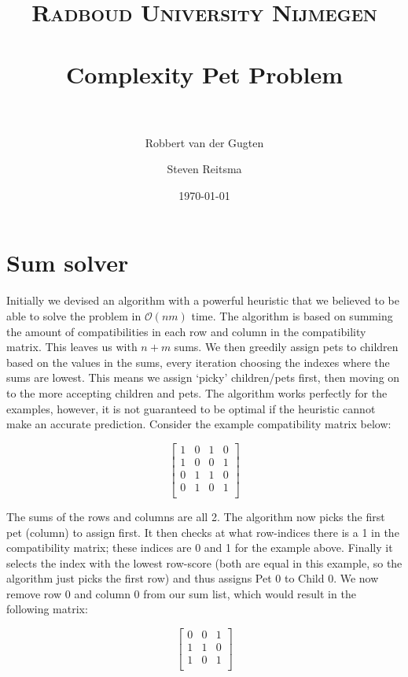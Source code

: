 \documentclass[paper=a4, fontsize=11pt]{scrartcl} %
\title{	
\normalfont \normalsize 
\textsc{Radboud University Nijmegen} \\ [25pt] %
\horrule{0.5pt} \\[0.4cm] %
\huge Complexity Pet Problem \\ %
\horrule{2pt} \\[0.5cm] %
}
\author{Robbert van der Gugten \and Steven Reitsma} %
\date{\normalsize\today} %
\numberwithin{equation}{section} %
\numberwithin{figure}{section} %
\numberwithin{table}{section} %
\begin{document}
\maketitle %


\section{Sum solver}

Initially we devised an algorithm with a powerful heuristic that we believed to be able to solve the problem in $\mathcal{O}(nm)$ time.
The algorithm is based on summing the amount of compatibilities in each row and column in the compatibility matrix.
This leaves us with $n+m$ sums.
We then greedily assign pets to children based on the values in the sums, every iteration choosing the indexes where the sums are lowest.
This means we assign `picky' children/pets first, then moving on to the more accepting children and pets.
The algorithm works perfectly for the examples, however, it is not guaranteed to be optimal if the heuristic cannot make an accurate prediction.
Consider the example compatibility matrix below:

\begin{equation}
	\begin{bmatrix}
	1 & 0 & 1 & 0\\
	1 & 0 & 0 & 1\\
	0 & 1 & 1 & 0\\
	0 & 1 & 0 & 1\\
	\end{bmatrix}
\end{equation}

The sums of the rows and columns are all 2.
The algorithm now picks the first pet (column) to assign first.
It then checks at what row-indices there is a 1 in the compatibility matrix; these indices are 0 and 1 for the example above.
Finally it selects the index with the lowest row-score (both are equal in this example, so the algorithm just picks the first row) and thus assigns Pet 0 to Child 0.
We now remove row 0 and column 0 from our sum list, which would result in the following matrix:

\begin{equation}
	\begin{bmatrix}
	0 & 0 & 1\\
	1 & 1 & 0\\
	1 & 0 & 1\\
	\end{bmatrix}
\end{equation}
\end{document}
